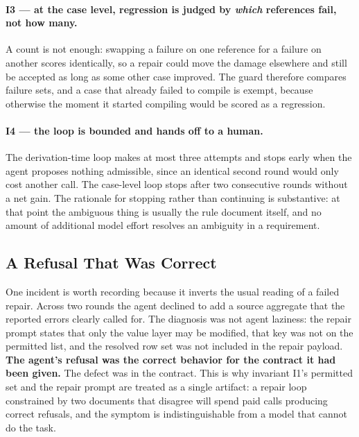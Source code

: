\paragraph{I3 --- at the case level, regression is judged by \emph{which} references fail, not how
many.}
A count is not enough: swapping a failure on one reference for a failure on another scores
identically, so a repair could move the damage elsewhere and still be accepted as long as some other
case improved. The guard therefore compares failure sets, and a case that already failed to compile is
exempt, because otherwise the moment it started compiling would be scored as a regression.

\paragraph{I4 --- the loop is bounded and hands off to a human.}
The derivation-time loop makes at most three attempts and stops early when the agent proposes nothing
admissible, since an identical second round would only cost another call. The case-level loop stops
after two consecutive rounds without a net gain. The rationale for stopping rather than continuing is
substantive: at that point the ambiguous thing is usually the rule document itself, and no amount of
additional model effort resolves an ambiguity in a requirement.

\subsection{A Refusal That Was Correct}

One incident is worth recording because it inverts the usual reading of a failed repair. Across two
rounds the agent declined to add a source aggregate that the reported errors clearly called for. The
diagnosis was not agent laziness: the repair prompt states that only the value layer may be modified,
that key was not on the permitted list, and the resolved row set was not included in the repair
payload. \textbf{The agent's refusal was the correct behavior for the contract it had been given.} The
defect was in the contract. This is why invariant I1's permitted set and the repair prompt are treated
as a single artifact: a repair loop constrained by two documents that disagree will spend paid calls
producing correct refusals, and the symptom is indistinguishable from a model that cannot do the task.

